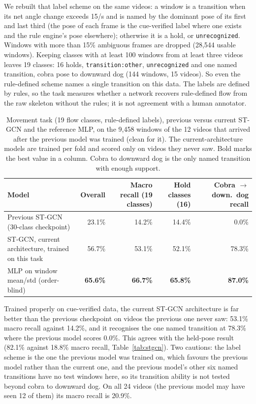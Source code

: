  We rebuilt that label scheme on the same videos: a window is a transition when its net angle change exceeds 15\textdegree/s and is named by the dominant pose of its first and last third (the pose of each frame is the cue-verified label where one exists and the rule engine's pose elsewhere); otherwise it is a hold, or \texttt{unrecognized}. Windows with more than 15\% ambiguous frames are dropped (28{,}544 usable windows). Keeping classes with at least 100 windows from at least three videos leaves 19 classes: 16 holds, \texttt{transition:other}, \texttt{unrecognized} and one named transition, cobra pose to downward dog (144 windows, 15 videos). So even the rule-defined scheme names a single transition on this data. The labels are defined by rules, so the task measures whether a network recovers rule-defined flow from the raw skeleton without the rules; it is not agreement with a human annotator.

\begin{table}[t]
\centering\footnotesize
\caption{Movement task (19 flow classes, rule-defined labels), previous versus current ST-GCN and the reference MLP, on the 9{,}458 windows of the 12 videos that arrived after the previous model was trained (clean for it). The current-architecture models are trained per fold and scored only on videos they never saw. Bold marks the best value in a column. Cobra to downward dog is the only named transition with enough support.}\label{tab:flow-oldnew}
\begin{tabular}{@{}lrrrr@{}}
\toprule
Model & Overall & Macro recall (19 classes) & Hold classes (16) & Cobra $\to$ down.\ dog recall \\ \midrule
Previous ST-GCN (30-class checkpoint) & 23.1\% & 14.2\% & 14.4\% & 0.0\% \\
ST-GCN, current architecture, trained on this task & 56.7\% & 53.1\% & 52.1\% & 78.3\% \\
MLP on window mean/std (order-blind) & \textbf{65.6\%} & \textbf{66.7\%} & \textbf{65.8\%} & \textbf{87.0\%} \\ \bottomrule
\end{tabular}
\end{table}

 Trained properly on cue-verified data, the current ST-GCN architecture is far better than the previous checkpoint on videos the previous one never saw: 53.1\% macro recall against 14.2\%, and it recognises the one named transition at 78.3\% where the previous model scores 0.0\%. This agrees with the held-pose result (82.1\% against 18.8\% macro recall, Table~\ref{tab:stgcn}). Two cautions: the label scheme is the one the previous model was trained on, which favours the previous model rather than the current one, and the previous model's other six named transitions have no test windows here, so its transition ability is not tested beyond cobra to downward dog. On all 24 videos (the previous model may have seen 12 of them) its macro recall is 20.9\%.


